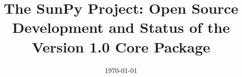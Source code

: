 \documentclass{aastex63}
\begin{document}
\title{The SunPy Project: Open Source Development and Status of the Version 1.0 Core Package}


\date{\today}

















\end{document}
